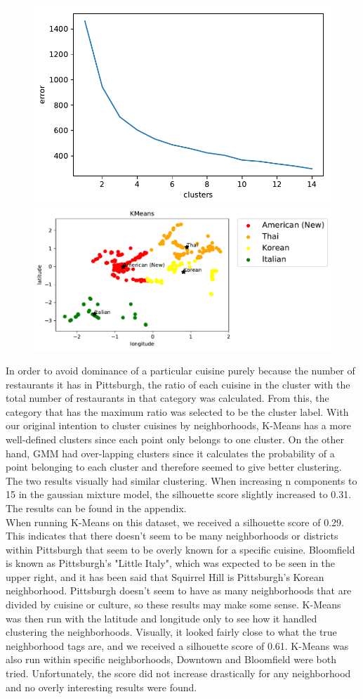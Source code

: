\documentclass{neu_handout}
\begin{document}
\begin{figure}[h]
\centering
{
\includegraphics[width=0.35\linewidth]{kmeans_error}
}
{
\includegraphics[width=0.5\linewidth]{kmeans_cuisines}
}
\end{figure}


In order to avoid dominance of a particular cuisine purely because the number of restaurants it has in Pittsburgh, the ratio of each cuisine in the cluster with the total number of restaurants in that category was calculated. From this, the category that has the maximum ratio was selected to be the cluster label. With our original intention to cluster cuisines by neighborhoods, K-Means has a more well-defined clusters since each point only belongs to one cluster. On the other hand, GMM had over-lapping clusters since it calculates the probability of a point belonging to each cluster and therefore seemed to give better clustering. The two results visually had similar clustering. When increasing n components to 15 in the gaussian mixture model, the silhouette score slightly increased to 0.31. The results can be found in the appendix.\\

When running K-Means on this dataset, we received a silhouette score of 0.29. This indicates that there doesn't seem to be many neighborhoods or districts within Pittsburgh that seem to be overly known for a specific cuisine. Bloomfield is known as Pittsburgh's "Little Italy", which was expected to be seen in the upper right, and it has been said that Squirrel Hill is Pittsburgh's Korean neighborhood. Pittsburgh doesn't seem to have as many neighborhoods that are divided by cuisine or culture, so these results may make some sense. K-Means was then run with the latitude and longitude only to see how it handled clustering the neighborhoods. Visually, it looked fairly close to what the true neighborhood tags are, and we received a silhouette score of 0.61. K-Means was also run within specific neighborhoods, Downtown and Bloomfield were both tried. Unfortunately, the score did not increase drastically for any neighborhood and no overly interesting results were found.
\end{document}
